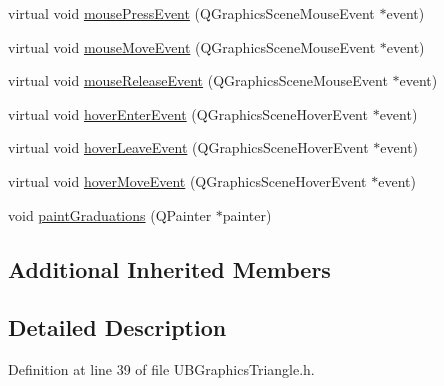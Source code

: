 \begin{DoxyCompactItemize}
\item 
virtual void \hyperlink{class_u_b_graphics_triangle_abfe47cb13f4ac483067c594e2b93b133}{mouse\-Press\-Event} (Q\-Graphics\-Scene\-Mouse\-Event $\ast$event)
\item 
virtual void \hyperlink{class_u_b_graphics_triangle_a8fa65aa12c208d10ebf3ed9c85bbb34f}{mouse\-Move\-Event} (Q\-Graphics\-Scene\-Mouse\-Event $\ast$event)
\item 
virtual void \hyperlink{class_u_b_graphics_triangle_aabf836e45bdb067d16abedd5b4fde345}{mouse\-Release\-Event} (Q\-Graphics\-Scene\-Mouse\-Event $\ast$event)
\item 
virtual void \hyperlink{class_u_b_graphics_triangle_a6fff939815a5e24edfb96351138f50ab}{hover\-Enter\-Event} (Q\-Graphics\-Scene\-Hover\-Event $\ast$event)
\item 
virtual void \hyperlink{class_u_b_graphics_triangle_a8992f53b1056a4ab316e410bbb64e6e2}{hover\-Leave\-Event} (Q\-Graphics\-Scene\-Hover\-Event $\ast$event)
\item 
virtual void \hyperlink{class_u_b_graphics_triangle_a799ab25a8ba3db55b33b27a7a303747c}{hover\-Move\-Event} (Q\-Graphics\-Scene\-Hover\-Event $\ast$event)
\item 
void \hyperlink{class_u_b_graphics_triangle_a69e92a960b5217519da8bdabf15a8ab8}{paint\-Graduations} (Q\-Painter $\ast$painter)
\end{DoxyCompactItemize}
\subsection*{Additional Inherited Members}


\subsection{Detailed Description}


Definition at line 39 of file U\-B\-Graphics\-Triangle.\-h.



